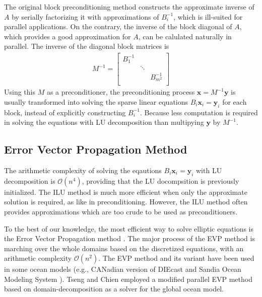 The original block preconditioning method constructs the approximate inverse of $A$ by serially factorizing it with approximations of $B_i^{-1}$, which is ill-suited for parallel applications. 
On the contrary, the inverse of the block diagonal of $A$, which provides a good approximation for $A$, can be calulated naturally in parallel.
The inverse of the diagonal block matrices is  
\begin{eqnarray*}
M^{-1}=    \left [
        \begin{array}{ccccccc}
        B_1^{-1} &   &  \\
         & \ddots&  \\
        &   &  B_{m^2}^{-1} \\
    \end{array}
    \right ]
\end{eqnarray*}
Using this $M$ as a preconditioner, the preconditioning process $\textbf{x} = M^{-1}\textbf{y}$ is usually transformed into solving the sparse linear equations $B_i \textbf{x}_i = \textbf{y}_i$ for each block,
instead of explicitly constructing $B_i^{-1}$.
Because less computation is required in solving the equations with LU decomposition than multipying $\textbf{y}$ by $M^{-1}$. 

\subsection{Error Vector Propagation Method}
The arithmetic complexity of solving the eqautions $B_i \textbf{x}_i = \textbf{y}_i$ with LU decomposition is $\mathcal{O}(n^4)$, providing that the LU docompsition is previously initialized.
The ILU method is much more efficient when only the approximate solution is required, as like in preconditioning. 
However, the ILU method often provides approximations which are too crude to be used as preconditioners.

To the best of our knowledge, the most efficient way to solve elliptic equations is the Error Vector Propagation method \cite{roache1995elliptic}. 
The major process of the EVP method is marching over the whole domains based on the discretized equations, with an arithmetic complexity $\mathcal{O}(n^2)$.
The EVP method and its variant have been used in some ocean models (e.g., CANadian version of DIEcast \cite{sheng1998candie} and Sandia Ocean Modeling System \cite{dietrich1987ocean}).
Tseng and Chien \cite{tseng2011parallel} employed a modified parallel EVP method based on domain-decomposition as a solver for the global ocean model. 



